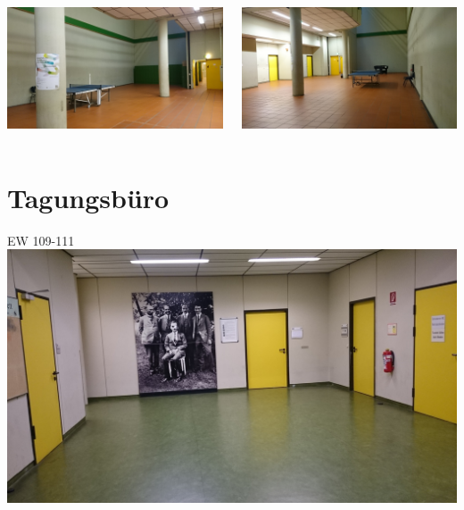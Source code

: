 \documentclass[compress,]{beamer}
\begin{document}
\begin{frame}
  \begin{columns}[onlytextwidth]
    \begin{column}{0.5\textwidth}
      \includegraphics[width=\textwidth]{images/bunker1.JPG}
    \end{column}
    \begin{column}{0.5\textwidth}
      \includegraphics[width=\textwidth]{images/bunker2.JPG}
    \end{column}
  \end{columns}
\end{frame}


\section{Tagungsbüro}
\begin{frame}{EW 109-111}
  \includegraphics[width=\textwidth]{images/tagungsbuero1.JPG}
\end{frame}
\end{document}
